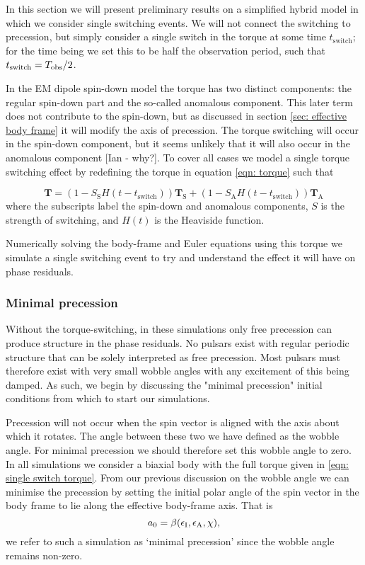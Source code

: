 \documentclass[../full_thesis/full_thesis.tex]{subfiles}
\begin{document}
In this section we will present preliminary results on a simplified hybrid model
in which we consider single switching events. We will not connect the switching
to precession, but simply consider a single switch in the torque at some time
$t_{\mathrm{switch}}$; for the time being we set this to be half the
observation period, such that $t_{\mathrm{switch}} = T_{\textrm{obs}}/2$.

In the EM dipole spin-down model the torque has two distinct components: the
regular spin-down part and the so-called anomalous component. This later term 
does not contribute to the spin-down, but as discussed in section \ref{sec: effective
body frame} it will modify the axis of precession. The torque switching will 
occur in the spin-down component, but it seems unlikely that it will also
occur in the anomalous component [Ian - why?]. To cover all cases we 
model a single torque switching effect by redefining the torque in equation
\eqref{eqn: torque} such that

\newcommand{\Ss}{S_{\mathrm{S}}}
\newcommand{\Sa}{S_{\mathrm{A}}}

\begin{equation}
\mathbf{T} = (1 - \Ss H(t-t_{\mathrm{switch}})) \mathbf{T}_{\mathrm{S}}+
                 (1 - \Sa H(t-t_{\mathrm{switch}})) \mathbf{T}_{\mathrm{A}}
\label{eqn: single switch torque}
\end{equation} 
where the subscripts label the spin-down and anomalous components, $S$ is the
strength of switching, and $H(t)$ is the Heaviside function. 

Numerically solving the body-frame and Euler equations using this torque we 
simulate a single switching event to try and understand the effect it will have
on phase residuals. 

\subsubsection{Minimal precession}
Without the torque-switching, in these simulations only free precession can 
produce structure in the phase residuals. No pulsars exist with regular periodic
structure that can be solely interpreted as free precession. Most pulsars must 
therefore exist with very small wobble angles with any excitement of this being
damped. As such, we begin by discussing the "minimal precession" initial 
conditions from which to start our simulations. 


Precession will not occur when the spin vector is aligned with the axis about
which it rotates. The angle between these two we have defined as the wobble
angle.  For minimal precession we should therefore set this wobble angle to
zero. In all simulations we consider a biaxial body with the full torque given
in \eqref{eqn: single switch torque}. From our previous discussion on the 
wobble angle we can minimise the precession by setting the initial polar angle
of the spin vector in the body frame to lie along the effective body-frame 
axis. That is
\begin{equation}
a_{0} = \beta(\epsilon_{\mathrm{I}}, \epsilon_{\mathrm{A}}, \chi),
\end{equation}
we refer to such a simulation as `minimal precession' since the wobble angle 
remains non-zero.
\end{document}
